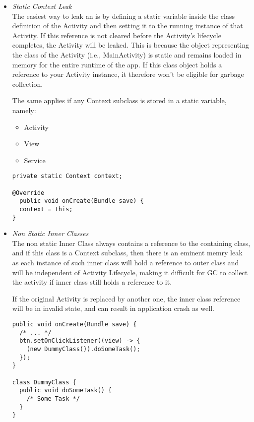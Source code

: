 \documentclass[journal]{IEEEtran}
\begin{document}
\begin{itemize}
	\item \emph{Static Context Leak}\\
	The easiest way to leak an  is by defining a static variable inside the class definition of the Activity and then setting it to the running instance of that Activity. If this reference is not cleared before the Activity’s lifecycle completes, the Activity will be leaked. This is because the object representing the class of the Activity (i.e., MainActivity) is static and remains loaded in memory for the entire runtime of the app. If this class object holds a reference to your Activity instance, it therefore won’t be eligible for garbage collection.
	
	The same applies if any Context subclass is stored in a static variable, namely:
	\begin{itemize}
		\item Activity
		\item View
		\item Service
	\end{itemize}
\begin{verbatim}
private static Context context;
	
@Override
  public void onCreate(Bundle save) {
  context = this;
}
\end{verbatim}

	\item \emph{Non Static Inner Classes}\\
	The non static Inner Class always contains a reference to the containing class, and if this class is a Context subclass, then there is an eminent memry leak as each instance of such inner class will hold a reference to outer class and will be independent of Activity Lifecycle, making it difficult for GC to collect the activity if inner class still holds a reference to it.
	
	If the original Activity is replaced by another one, the inner class reference will be in invalid state, and can result in application crash as well.
\begin{verbatim}
public void onCreate(Bundle save) {
  /* ... */
  btn.setOnClickListener((view) -> {
    (new DummyClass()).doSomeTask();
  });
}

class DummyClass {
  public void doSomeTask() {
    /* Some Task */
  }
}
\end{verbatim}


\end{itemize}
\end{document}
